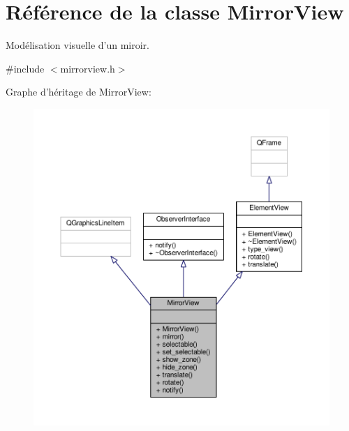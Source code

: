 \hypertarget{classMirrorView}{\section{Référence de la classe Mirror\+View}
\label{classMirrorView}
}


Modélisation visuelle d’un miroir.  




{\ttfamily \#include $<$mirrorview.\+h$>$}



Graphe d'héritage de Mirror\+View\+:\nopagebreak
\begin{figure}[H]
\begin{center}
\leavevmode
\includegraphics[width=350pt]{d2/d7b/classMirrorView__inherit__graph}
\end{center}
\end{figure}


